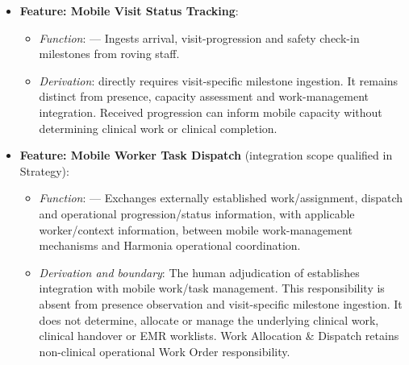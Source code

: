 \begin{itemize}
\begin{itemize}
\begin{itemize}
\item
\emph{Exposed Service}: \texttt{} — Discloses on-duty staff availability by hospital zone.



\end{itemize}


\item
\textbf{Feature: Mobile Visit Status Tracking}:


\begin{itemize}

\item
\emph{Function}: \texttt{} — Ingests arrival, visit-progression and safety check-in milestones from roving staff.



\item
\emph{Derivation}: \texttt{} directly requires visit-specific milestone ingestion. It remains distinct from presence, capacity assessment and work-management integration. Received progression can inform mobile capacity without determining clinical work or clinical completion.



\end{itemize}


\item
\textbf{Feature: Mobile Worker Task Dispatch} (integration scope qualified in Strategy):


\begin{itemize}

\item
\emph{Function}: \texttt{} — Exchanges externally established work/\allowbreak{}assignment, dispatch and operational progression/\allowbreak{}status information, with applicable worker/\allowbreak{}context information, between mobile work-management mechanisms and Harmonia operational coordination.



\item
\emph{Derivation and boundary}: The human adjudication of \texttt{} establishes integration with mobile work/\allowbreak{}task management. This responsibility is absent from presence observation and visit-specific milestone ingestion. It does not determine, allocate or manage the underlying clinical work, clinical handover or EMR worklists. Work Allocation \& Dispatch retains non-clinical operational Work Order responsibility.




\end{itemize}
\end{itemize}
\end{itemize}
